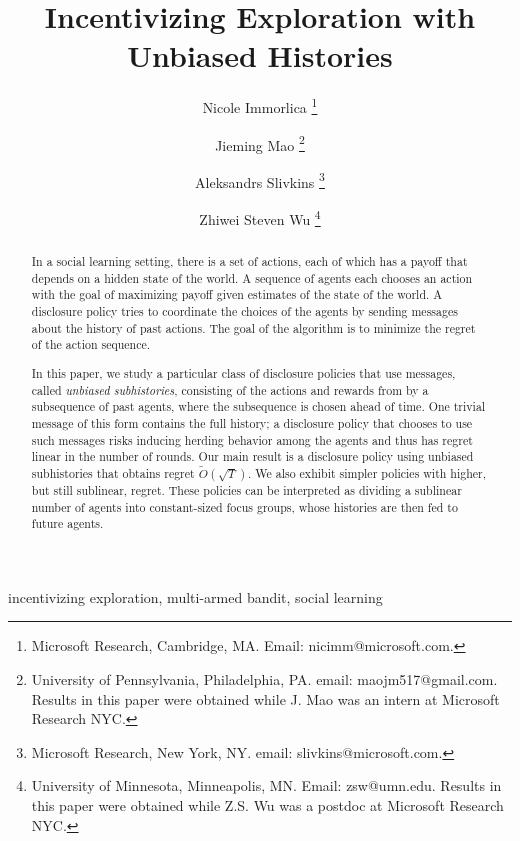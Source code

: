 \documentclass[anon,12pt]{colt2019}
\title{Incentivizing Exploration with Unbiased Histories}
\author{
Nicole Immorlica \thanks{Microsoft Research, Cambridge, MA. Email: nicimm@microsoft.com.}
\and
Jieming Mao \thanks{University of Pennsylvania, Philadelphia, PA. email: maojm517@gmail.com. Results in this paper were obtained while J. Mao was an intern at Microsoft Research NYC.}
\and
Aleksandrs Slivkins  \thanks{Microsoft Research, New York, NY. email: slivkins@microsoft.com.}
\and
Zhiwei Steven Wu  \thanks{University of Minnesota, Minneapolis, MN. Email: zsw@umn.edu. Results in this paper were obtained while Z.S. Wu was a postdoc at Microsoft Research NYC.}
}
\begin{document}
\begin{titlepage}
\maketitle

\thispagestyle{empty}
\begin{abstract}
In a social learning setting, there is a set of actions, each of which has a payoff that depends on a hidden state of the world. A sequence of agents each chooses an action with the goal of maximizing payoff given estimates of the state of the world.  A disclosure policy tries to coordinate the choices of the agents by sending messages about the history of past actions.  The goal of the algorithm is to minimize the regret of the action sequence.

In this paper, we study a particular class of disclosure policies that use messages, called {\em unbiased subhistories}, consisting of the actions and rewards from by a subsequence of past agents, where the subsequence is chosen ahead of time. One trivial message of this form contains the full history; a disclosure policy that chooses to use such messages risks inducing herding behavior among the agents and thus has regret linear in the number of rounds.  Our main result is a disclosure policy using unbiased subhistories that obtains regret $\tilde{O}(\sqrt{T})$.  We also exhibit simpler policies with higher, but still sublinear, regret.  These policies can be interpreted as dividing a sublinear number of agents into constant-sized focus groups, whose histories are then fed to future agents.
\end{abstract}
\begin{keywords}%
  incentivizing exploration, multi-armed bandit, social learning
\end{keywords}
\end{titlepage}



%







%
%


\appendix






%
\end{document}
